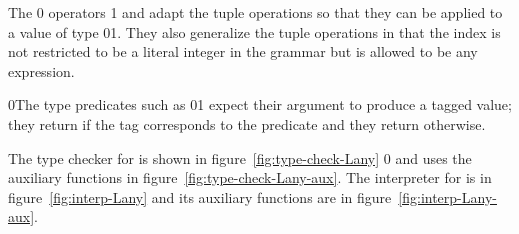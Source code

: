 \documentclass[7x10]{TimesAPriori_MIT}%
\def\racketEd{0}
\def\pythonEd{1}
\def\edition{0}
\newcommand{\racket}[1]{{\if\edition\racketEd{#1}\fi}}
\newcommand{\python}[1]{{\if\edition\pythonEd #1\fi}}
\numberwithin{theorem}{chapter}
\numberwithin{definition}{chapter}
\numberwithin{equation}{chapter}
\begin{document}
The \racket{} operators
\python{ and }
adapt the tuple operations so that they can be applied to a value of
type \racket{}\python{}.  They also generalize the
tuple operations in that the index is not restricted to be a literal
integer in the grammar but is allowed to be any expression.

\racket{The type predicates such as
\racket{}\python{\key{is\_bool}} expect their argument
to produce a tagged value; they return  {\TRUE} if the tag corresponds to
the predicate and they return {\FALSE} otherwise.}

The type checker for \LangAny{} is shown in
figure~\ref{fig:type-check-Lany}
%
\racket{ and uses the auxiliary functions in
figure~\ref{fig:type-check-Lany-aux}}.
%
The interpreter for \LangAny{} is in figure~\ref{fig:interp-Lany} and
its auxiliary functions are in figure~\ref{fig:interp-Lany-aux}.
\end{document}
